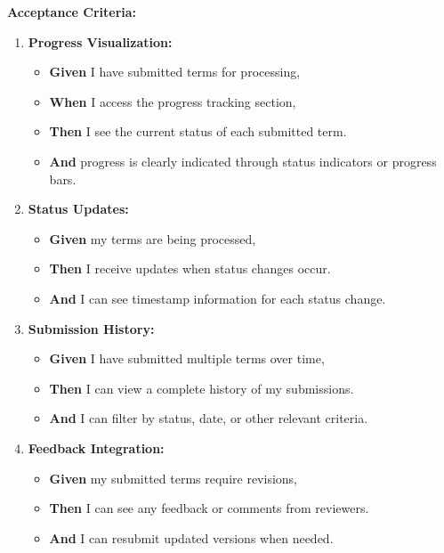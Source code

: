 \documentclass[12pt]{article}
\begin{document}
\vspace{1em}
\textbf{Acceptance Criteria:}
\begin{enumerate}
    \item \textbf{Progress Visualization:}
    \begin{itemize}
        \item \textbf{Given} I have submitted terms for processing,
        \item \textbf{When} I access the progress tracking section,
        \item \textbf{Then} I see the current status of each submitted term.
        \item \textbf{And} progress is clearly indicated through status indicators or progress bars.
    \end{itemize}

    \item \textbf{Status Updates:}
    \begin{itemize}
        \item \textbf{Given} my terms are being processed,
        \item \textbf{Then} I receive updates when status changes occur.
        \item \textbf{And} I can see timestamp information for each status change.
    \end{itemize}

    \item \textbf{Submission History:}
    \begin{itemize}
        \item \textbf{Given} I have submitted multiple terms over time,
        \item \textbf{Then} I can view a complete history of my submissions.
        \item \textbf{And} I can filter by status, date, or other relevant criteria.
    \end{itemize}

    \item \textbf{Feedback Integration:}
    \begin{itemize}
        \item \textbf{Given} my submitted terms require revisions,
        \item \textbf{Then} I can see any feedback or comments from reviewers.
        \item \textbf{And} I can resubmit updated versions when needed.
    \end{itemize}
\end{enumerate}
\end{document}
